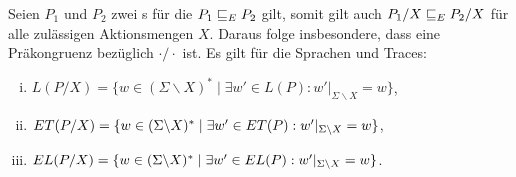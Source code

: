 \begin{Satz}
  \label{FehlerHidingSatz}
  Seien $P_1$ und $P_2$ zwei \MEIO{}s für die $P_1 \sqsubseteq  _E P_2$ gilt, somit gilt
  auch $P_1/X \sqsubseteq  _E P_2/X$ für alle zulässigen Aktionsmengen $X$. Daraus folge
  insbesondere, dass \ERel{} eine Präkongruenz bezüglich $\cdot /\cdot$ ist. Es
  gilt für die Sprachen und Traces:
  \begin{enumerate}[(i)]
    \item $L(P/X) = \{w\in (\Sigma\backslash X)^*\mid \exists w'\in L(P):
      w'|_{\Sigma\backslash X} = w\}$,
    \item $ET (P/X) = \{w\in (\Sigma\backslash X)^*\mid \exists w'\in ET(P):
      w'|_{\Sigma\backslash X} = w\}$,
    \item $EL (P/X) = \{w\in (\Sigma\backslash X)^*\mid \exists w'\in EL(P):
      w'|_{\Sigma\backslash X} = w\}$.
  \end{enumerate}
\end{Satz}
